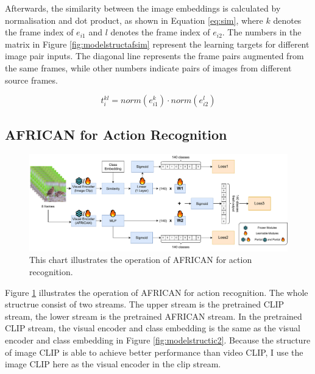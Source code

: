 Afterwards, the similarity between the image embeddings is calculated by normalisation and dot product, as shown in Equation \ref{eq:sim}, where $k$ denotes the frame index of $e_{i1}$ and $l$ denotes the frame index of $e_{i2}$. The numbers in the matrix in Figure \ref{fig:modelstructafsim} represent the learning targets for different image pair inputs. The diagonal line represents the frame pairs augmented from the same frames, while other numbers indicate pairs of images from different source frames. 

\begin{equation}
    \label{eq:sim}
    t_{i}^{kl} = norm(e_{i1}^{k}) \cdot norm(e_{i2}^{l})
\end{equation}




\subsection{AFRICAN for Action Recognition}

\begin{figure}[ht]
    \centering
    \includegraphics[width=1.0\textwidth]{assets/imgs/3_4_ModelStructureAF}
    \caption[Operation of AFRICAN for action recognition]{This chart illustrates the operation of AFRICAN for action recognition.}
    \label{fig:modelstructaf_ar}
\end{figure}

Figure \ref{fig:modelstructaf_ar} illustrates the operation of AFRICAN for action recognition. The whole structrue consist of two streams. The upper stream is the pretrained CLIP stream, the lower stream is the pretrained AFRICAN stream.
In the pretrained CLIP stream, the visual encoder and class embedding is the same as the visual encoder and class embedding in Figure \ref{fig:modelstructic2}. Because the structure of image CLIP is able to achieve better performance than video CLIP, I use the image CLIP here as the visual encoder in the clip stream. 

